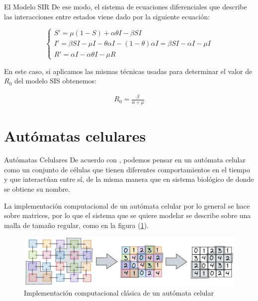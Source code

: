\documentclass[9pt]{beamer}
\begin{document}
\begin{frame}{El Modelo SIR}
De ese modo, el sistema de ecuaciones diferenciales que describe las interacciones entre estados viene dado por la siguiente ecuación:

\begin{equation}\label{eq:Modelo SIR}
\left\{
\begin{array}{l}
S' = \mu(1 - S) + \alpha\theta I - \beta S I \\
I' = \beta S I - \mu I - \theta\alpha I - (1 - \theta)\alpha I = \beta S I - \alpha I - \mu I \\
R' = \alpha I - \alpha\theta I - \mu R
\end{array}
\right.
\end{equation}

En este caso, si aplicamos las mismas técnicas usadas para determinar el valor de $R_0$ del modelo SIS obtenemos:

\begin{align*}
R_0 = \frac{\beta}{\alpha+\mu}
\end{align*}
\end{frame}

\section{Autómatas celulares}
\begin{frame}{Autómatas Celulares}
De acuerdo con \cite{descripcionyAplicaciones}, podemos pensar en un autómata celular como un conjunto de células que tienen diferentes comportamientos en el tiempo y que interactúan entre sí, de la misma manera que en sistema biológico de donde se obtiene su nombre.

La implementación computacional de un autómata celular por lo general se hace sobre matrices, por lo que el sistema que se quiere modelar se describe sobre una malla de tamaño regular, como en la figura (\ref{fig:AC a matriz}).

\begin{figure}[h]
  \centering
    \includegraphics[width=1\textwidth]{Imagenes/ACaMatriz.PNG}
  \caption{Implementación computacional clásica de un autómata celular}
  \label{fig:AC a matriz}
\end{figure}
\end{frame}
\end{document}
